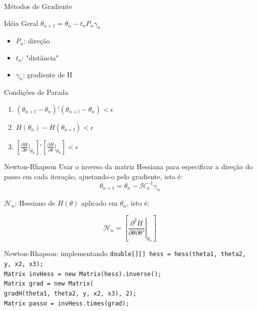 \documentclass{beamer}
\begin{document}
\begin{frame}{Métodos de Gradiente}
\begin{block}{Idéia Geral}
$ \theta_{n+1} = \theta_{n} - t_{n}P_{n}\gamma_{n} $

\begin{itemize}
\item $P_{n}$: direção
\item $t_{n}$: "distância"
\item $\gamma_{n}$: gradiente de H
\end{itemize}
\end{block}
\begin{block}{Condições de Parada}
\begin{enumerate}
\item $ ( \theta_{n+l} - \theta_n )'( \theta_{n+l} - \theta_n ) < \epsilon$
\item $ H(  \theta_n )- H (\theta_{n+l} ) < \epsilon$
\item $  [\frac{\partial H}{\partial \theta}\vert_{\theta_n}]'[\frac{\partial H}{\partial \theta}\vert_{\theta_n}] < \epsilon$
\end{enumerate}
\end{block}

\end{frame}

\begin{frame}{Newton-Rhapson}
Usar o inverso da matriz Hessiana para especificar a direção do passo em cada iteração, ajustando-o pelo gradiente, isto é:
\[ \theta_{n+1} = \theta_{n} - \mathcal{H}_{n}^{-1}\gamma_{n}  \]


$\mathcal{H}_n$: Hessiano de $H(\theta)$ aplicado em $\theta_n$, isto é:

\[  \mathcal{H}_n = \left [ \left . \frac{\partial^2 H}{\partial \theta \partial \theta'} \right |_{\theta_n}  \right ] \]

\end{frame}

\begin{frame}{Newton-Rhapson: implementando}
\small{\texttt{double[][] hess = hess(theta1, theta2, y, x2, x3);\\
Matrix invHess = new Matrix(hess).inverse();\\
Matrix grad = new Matrix(\\\hspace{2pc}gradH(theta1, theta2, y, x2, x3), 2);\\
Matrix passo = invHess.times(grad);}}
\end{frame}
\end{document}
